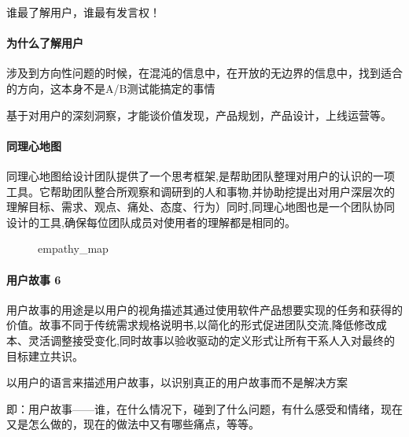 \documentclass[letterpaper,11pt,english]{sphinxmanual}
\begin{document}
谁最了解用户，谁最有发言权！


\paragraph{为什么了解用户}
\label{\detokenize{chapter_skill/users_analysis:id4}}
涉及到方向性问题的时候，在混沌的信息中，在开放的无边界的信息中，找到适合的方向，这本身不是A/B测试能搞定的事情

基于对用户的深刻洞察，才能谈价值发现，产品规划，产品设计，上线运营等。


\paragraph{同理心地图}
\label{\detokenize{chapter_skill/users_analysis:id5}}
同理心地图给设计团队提供了一个思考框架,是帮助团队整理对用户的认识的一项工具。它帮助团队整合所观察和调研到的人和事物,并协助挖提出对用户深层次的理解目标、需求、观点、痛处、态度、行为）同时,同理心地图也是一个团队协同设计的工具,确保每位团队成员对使用者的理解都是相同的。

\begin{figure}[H]
\centering
\capstart

\noindent{}
\caption{empathy\_map}\label{\detokenize{chapter_skill/users_analysis:id26}}\end{figure}


\paragraph{用户故事 6\sphinxfootnotemark[154]}
\label{\detokenize{chapter_skill/users_analysis:id6}}%
\begin{footnotetext}[154]\sphinxAtStartFootnote
{}
%
\end{footnotetext}\ignorespaces 
用户故事的用途是以用户的视角描述其通过使用软件产品想要实现的任务和获得的价值。故事不同于传统需求规格说明书,以简化的形式促进团队交流,降低修改成本、灵活调整接受变化,同时故事以验收驱动的定义形式让所有干系人入对最终的目标建立共识。

以用户的语言来描述用户故事，以识别真正的用户故事而不是解决方案

即：用户故事——谁，在什么情况下，碰到了什么问题，有什么感受和情绪，现在又是怎么做的，现在的做法中又有哪些痛点，等等。
%
\begin{footnote}[155]\sphinxAtStartFootnote
{}
%
\end{footnote}
\end{document}
